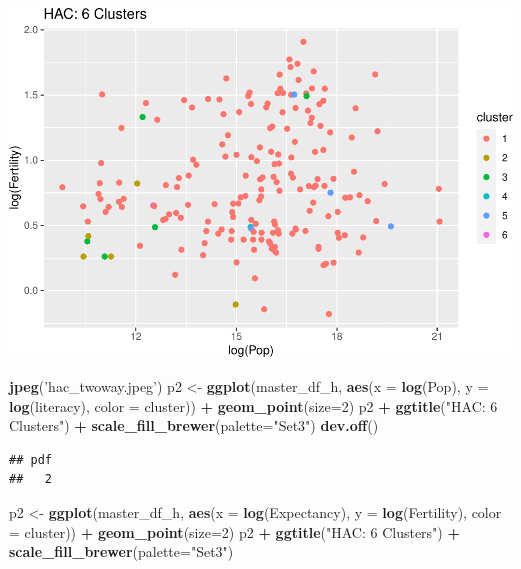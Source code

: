 \documentclass[]{article}
\newenvironment{Shaded}{\begin{snugshade}}{\end{snugshade}}
\newcommand{\DataTypeTok}[1]{\textcolor[rgb]{0.13,0.29,0.53}{#1}}
\newcommand{\DecValTok}[1]{\textcolor[rgb]{0.00,0.00,0.81}{#1}}
\newcommand{\KeywordTok}[1]{\textcolor[rgb]{0.13,0.29,0.53}{\textbf{#1}}}
\newcommand{\NormalTok}[1]{#1}
\newcommand{\OperatorTok}[1]{\textcolor[rgb]{0.81,0.36,0.00}{\textbf{#1}}}
\newcommand{\StringTok}[1]{\textcolor[rgb]{0.31,0.60,0.02}{#1}}
\begin{document}
\includegraphics{eda_files/figure-latex/unnamed-chunk-27-7.pdf}

\begin{Shaded}
\begin{Highlighting}[]
\KeywordTok{jpeg}\NormalTok{(}\StringTok{'hac_twoway.jpeg'}\NormalTok{)}
\NormalTok{p2 <-}\StringTok{ }\KeywordTok{ggplot}\NormalTok{(master_df_h, }\KeywordTok{aes}\NormalTok{(}\DataTypeTok{x =} \KeywordTok{log}\NormalTok{(Pop), }\DataTypeTok{y =} \KeywordTok{log}\NormalTok{(literacy), }\DataTypeTok{color =}\NormalTok{ cluster)) }\OperatorTok{+}
\StringTok{  }\KeywordTok{geom_point}\NormalTok{(}\DataTypeTok{size=}\DecValTok{2}\NormalTok{)}
\NormalTok{p2 }\OperatorTok{+}\StringTok{ }\KeywordTok{ggtitle}\NormalTok{(}\StringTok{"HAC: 6 Clusters"}\NormalTok{) }\OperatorTok{+}\StringTok{ }\KeywordTok{scale_fill_brewer}\NormalTok{(}\DataTypeTok{palette=}\StringTok{"Set3"}\NormalTok{)}
\KeywordTok{dev.off}\NormalTok{()}
\end{Highlighting}
\end{Shaded}

\begin{verbatim}
## pdf 
##   2
\end{verbatim}

\begin{Shaded}
\begin{Highlighting}[]
\NormalTok{p2 <-}\StringTok{ }\KeywordTok{ggplot}\NormalTok{(master_df_h, }\KeywordTok{aes}\NormalTok{(}\DataTypeTok{x =} \KeywordTok{log}\NormalTok{(Expectancy), }\DataTypeTok{y =} \KeywordTok{log}\NormalTok{(Fertility), }\DataTypeTok{color =}\NormalTok{ cluster)) }\OperatorTok{+}
\StringTok{  }\KeywordTok{geom_point}\NormalTok{(}\DataTypeTok{size=}\DecValTok{2}\NormalTok{)}
\NormalTok{p2 }\OperatorTok{+}\StringTok{ }\KeywordTok{ggtitle}\NormalTok{(}\StringTok{"HAC: 6 Clusters"}\NormalTok{) }\OperatorTok{+}\StringTok{ }\KeywordTok{scale_fill_brewer}\NormalTok{(}\DataTypeTok{palette=}\StringTok{"Set3"}\NormalTok{)}
\end{Highlighting}
\end{Shaded}
\end{document}
